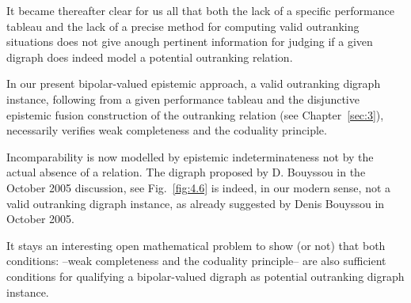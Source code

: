 It became thereafter clear for us all that both the lack of a specific performance tableau and the lack of a precise method for computing valid outranking situations does not give anough pertinent information for judging if a given digraph does indeed model a potential outranking relation.

In our present bipolar-valued epistemic approach, a valid outranking digraph instance, following from a given performance tableau and the disjunctive epistemic fusion construction of the outranking relation (see Chapter~\ref{sec:3}), necessarily verifies weak completeness and the coduality principle.

Incomparability is now modelled by epistemic indeterminateness not by the actual absence of a relation. The digraph proposed by D. Bouyssou in the October 2005 discussion, see Fig.~\ref{fig:4.6} is indeed, in our modern sense, not a valid outranking digraph instance, as already suggested by Denis Bouyssou in October 2005.

It stays an interesting open mathematical problem to show (or not) that both conditions: --weak completeness and the coduality principle-- are also sufficient conditions for qualifying a bipolar-valued digraph as potential outranking digraph instance.


\clearpage


%
